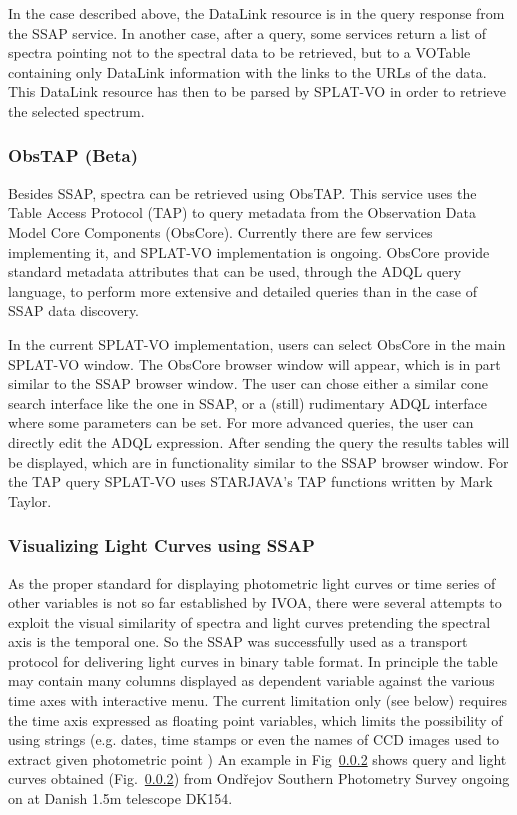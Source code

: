 \documentclass[final,authoryear,5p,times,twocolumn]{elsarticle}
\begin{document}
In the case described above, the DataLink resource is in the query
response from the SSAP service. In another case, after a query, some
services return a list of spectra pointing not to the spectral data to
be retrieved, but to a VOTable containing only DataLink information
with the links to the URLs of the data. This DataLink resource has
then to be parsed by SPLAT-VO in order to retrieve the selected spectrum.

\subsubsection{ObsTAP (Beta)}

Besides SSAP, spectra can be retrieved using ObsTAP. This service uses
the Table Access Protocol (TAP) to query metadata from the Observation
Data Model Core Components (ObsCore). Currently there are few services
implementing it, and SPLAT-VO implementation is ongoing.  ObsCore
provide standard metadata attributes that can be used, through the
ADQL query language, to perform more extensive and detailed queries
than in the case of SSAP data discovery.

In the current SPLAT-VO implementation, users can select ObsCore in the
main SPLAT-VO window. The ObsCore browser window will appear, which is in
part similar to the SSAP browser window. The user can chose either a
similar cone search interface like the one in SSAP, or a (still)
rudimentary ADQL interface where some parameters can be set. For more
advanced queries, the user can directly edit the ADQL
expression. After sending the query the results tables will be
displayed, which are in functionality similar to the SSAP browser
window. For the TAP query SPLAT-VO uses STARJAVA's TAP functions written
by Mark Taylor.


\subsubsection{Visualizing Light Curves using  SSAP}

As the proper standard for displaying photometric light curves or time
series of other variables is not so far established by IVOA, there were
several attempts to exploit the visual similarity of spectra and light
curves pretending the spectral axis is the temporal one.  So the SSAP
was successfully used as a transport protocol for delivering light
curves in binary table format. In principle the table may contain many
columns displayed as dependent variable against the various time axes
with interactive menu.  The current limitation only (see below)
requires the time axis expressed as floating point variables, which
limits the possibility of using strings (e.g. dates, time stamps or
even the names of CCD images used to extract given photometric point )
An example in Fig~\ref{} shows  query and light curves obtained  (Fig.~\ref{})  from
Ond\v{r}ejov Southern Photometry Survey \citep{skoda_adassxxiii} ongoing on  at Danish 1.5m telescope DK154.
\end{document}
